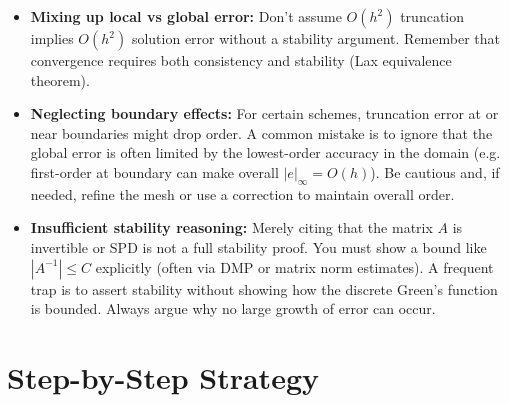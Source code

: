 \documentclass[a4paper,11pt]{report}
\begin{document}
\begin{pitfalls}{}{}
    \begin{itemize}
        \item \textbf{Mixing up local vs global error:} Don't assume $O(h^2)$ truncation implies $O(h^2)$ solution error without a stability argument. Remember that convergence requires both consistency and stability (Lax equivalence theorem).
        \item \textbf{Neglecting boundary effects:} For certain schemes, truncation error at or near boundaries might drop order. A common mistake is to ignore that the global error is often limited by the lowest-order accuracy in the domain (e.g. first-order at boundary can make overall $|e|_{\infty}=O(h)$). Be cautious and, if needed, refine the mesh or use a correction to maintain overall order.
        \item \textbf{Insufficient stability reasoning:} Merely citing that the matrix $A$ is invertible or SPD is not a full stability proof. You must show a bound like $|A^{-1}| \le C$ explicitly (often via DMP or matrix norm estimates). A frequent trap is to assert stability without showing how the discrete Green's function is bounded. Always argue why no large growth of error can occur.
    \end{itemize}
\end{pitfalls}
\clearpage

\section{Step-by-Step Strategy}
\end{document}
